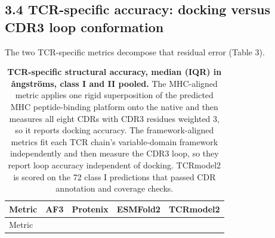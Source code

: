 \documentclass[
  11pt,
]{article}
\begin{document}
\subsection{3.4 TCR-specific accuracy: docking versus CDR3 loop
conformation}\label{tcr-specific-accuracy-docking-versus-cdr3-loop-conformation}

The two TCR-specific metrics decompose that residual error (Table 3).

\begin{longtable}[]{@{}
  >{\raggedright\arraybackslash}p{}
  >{\raggedright\arraybackslash}p{}
  >{\raggedright\arraybackslash}p{}
  >{\raggedright\arraybackslash}p{}
  >{\raggedright\arraybackslash}p{}@{}}
\caption{\textbf{TCR-specific structural accuracy, median (IQR) in
\aa{}ngströms, class I and II pooled.} The MHC-aligned metric applies one
rigid superposition of the predicted MHC peptide-binding platform onto
the native and then measures all eight CDRs with CDR3 residues weighted
3, so it reports docking accuracy. The framework-aligned metrics fit
each TCR chain's variable-domain framework independently and then
measure the CDR3 loop, so they report loop accuracy independent of
docking. TCRmodel2 is scored on the 72 class I predictions that passed
CDR annotation and coverage checks.}\tabularnewline
\toprule\noalign{}
\begin{minipage}[b]{\linewidth}\raggedright
Metric
\end{minipage} & \begin{minipage}[b]{\linewidth}\raggedright
AF3
\end{minipage} & \begin{minipage}[b]{\linewidth}\raggedright
Protenix
\end{minipage} & \begin{minipage}[b]{\linewidth}\raggedright
ESMFold2
\end{minipage} & \begin{minipage}[b]{\linewidth}\raggedright
TCRmodel2
\end{minipage} \\
\midrule\noalign{}
\endfirsthead
\toprule\noalign{}
\begin{minipage}[b]{\linewidth}\raggedright
Metric
\end{minipage} & \begin{minipage}[b]{\linewidth}\raggedright

\end{minipage}
\end{longtable}
\end{document}
